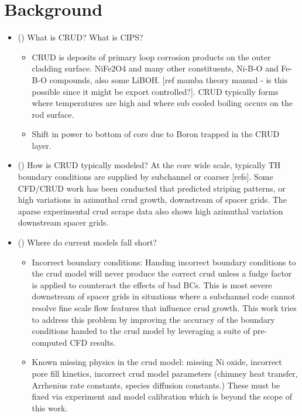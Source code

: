 
\section{Background}

\begin{itemize}
        \item (\checkmark) What is CRUD?  What is CIPS?
                \begin{itemize}
                \item CRUD is deposits of primary loop corrosion products on the outer cladding surface.  NiFe2O4 and many other constituents, Ni-B-O and Fe-B-O compounds, also some LiBOH. [ref mamba theory manual - is this possible since it might be export controlled?].  CRUD  typically forms where temperatures are high and where sub cooled boiling occurs on the rod surface.
                \item Shift in power to bottom of core due to Boron trapped in the CRUD layer.
                \end{itemize}
        \item (\checkmark) How is CRUD typically modeled?  At the core wide scale, typically TH boundary conditions are supplied by subchannel or coarser [refs].  Some CFD/CRUD work has been conducted that predicted striping patterns, or high variations in azimuthal crud growth, downstream of spacer grids.  The aparse experimental crud scrape data also shows high azimuthal variation downstream spacer grids.
        \item (\checkmark) Where do current models fall short?
        \begin{itemize}
                \item Incorrect boundary conditions: Handing incorrect boundary conditions to the crud model will never produce the correct crud unless a fudge factor is applied to counteract the effects of bad BCs.  This is most severe downstream of spacer grids in situations where a subchannel code cannot resolve fine scale flow features that influence crud growth.  This work tries to address this problem by improving the accuracy of the boundary conditions handed to the crud model by leveraging a suite of pre-computed CFD results.
                \item Known missing physics in the crud model: missing Ni oxide, incorrect pore fill kinetics, incorrect crud model parameters (chimney heat transfer, Arrhenius rate constants, species diffusion constants.) These must be fixed via experiment and model calibration which is beyond the scope of this work.
        \end{itemize}
\end{itemize}

